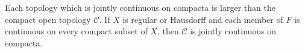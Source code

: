 Each topology which is jointly continuous on compacta is larger than the compact open topology $\mathcal{C}$. If $X$ is regular or Hausdorff and each member of $F$ is continuous on every compact subset of $X$, then $\mathcal{C}$ is jointly continuous on compacta.
